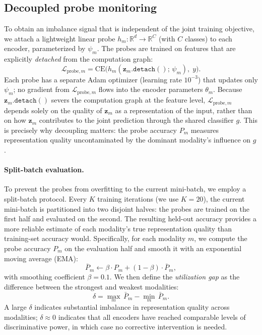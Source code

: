 \documentclass{article}
\newcommand{\loss}{\mathcal{L}}
\newcommand{\probe}{h}
\begin{document}
\subsection{Decoupled probe monitoring}
\label{sec:probes}

To obtain an imbalance signal that is independent of the joint training objective, we attach a lightweight linear probe $\probe_m\colon \mathbb{R}^d \to \mathbb{R}^C$ (with $C$ classes) to each encoder, parameterized by $\psi_m$. The probes are trained on features that are explicitly \emph{detached} from the computation graph:
%
\begin{equation}
\label{eq:probe_loss}
\loss_{\text{probe},m} = \mathrm{CE}\!\bigl(\probe_m(\mathbf{z}_m.\texttt{detach}();\,\psi_m),\; y\bigr).
\end{equation}
%
Each probe has a separate Adam optimizer (learning rate $10^{-3}$) that updates only $\psi_m$; no gradient from $\loss_{\text{probe},m}$ flows into the encoder parameters $\theta_m$. Because $\mathbf{z}_m.\texttt{detach}()$ severs the computation graph at the feature level, $\loss_{\text{probe},m}$ depends solely on the quality of $\mathbf{z}_m$ as a representation of the input, rather than on how $\mathbf{z}_m$ contributes to the joint prediction through the shared classifier $g$. This is precisely why decoupling matters: the probe accuracy $P_m$ measures representation quality uncontaminated by the dominant modality's influence on $g$.

\paragraph{Split-batch evaluation.}
To prevent the probes from overfitting to the current mini-batch, we employ a split-batch protocol. Every $K$ training iterations (we use $K{=}20$), the current mini-batch is partitioned into two disjoint halves: the probes are trained on the first half and evaluated on the second. The resulting held-out accuracy provides a more reliable estimate of each modality's true representation quality than training-set accuracy would. Specifically, for each modality $m$, we compute the probe accuracy $P_m$ on the evaluation half and smooth it with an exponential moving average (EMA):
%
\begin{equation}
\label{eq:ema_probe}
\bar{P}_m \leftarrow \beta \cdot P_m + (1 - \beta) \cdot \bar{P}_m,
\end{equation}
%
with smoothing coefficient $\beta = 0.1$. We then define the \emph{utilization gap} as the difference between the strongest and weakest modalities:
%
\begin{equation}
\label{eq:utilization_gap}
\delta = \max_{m}\,\bar{P}_m - \min_{m}\,\bar{P}_m.
\end{equation}
%
A large $\delta$ indicates substantial imbalance in representation quality across modalities; $\delta \approx 0$ indicates that all encoders have reached comparable levels of discriminative power, in which case no corrective intervention is needed.
\end{document}
